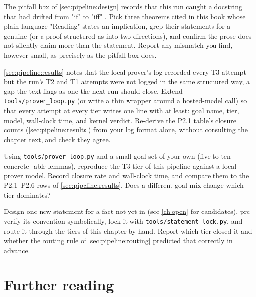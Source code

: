 \begin{exercise}[$\star\star$]\label{ex:pipeline:iff}
The pitfall box of \cref{sec:pipeline:design} records that this run caught a docstring
that had drifted from "if" to "iff" . Pick three
theorems cited in this book whose plain-language "Reading" states an implication, grep
their statements for a genuine  (or a proof structured as 
into two directions), and confirm the prose does not silently claim more than the
statement. Report any mismatch you find, however small, as precisely as the pitfall box
does.
\end{exercise}

\begin{exercise}[$\star\star$]\label{ex:pipeline:logging}
\cref{sec:pipeline:results} notes that the local prover's log recorded every T3 attempt
but the run's T2 and T1 attempts were not logged in the same structured way, a gap the
text flags as one the next run should close. Extend \texttt{tools/prover\_loop.py} (or
write a thin wrapper around a hosted-model call) so that every attempt at every tier
writes one line with at least: goal name, tier, model, wall-clock time, and kernel
verdict. Re-derive the P2.1 table's closure counts (\cref{sec:pipeline:results}) from your
log format alone, without consulting the chapter text, and check they agree.
\end{exercise}

\begin{exercise}[$\star\star\star$]
Using \texttt{tools/prover\_loop.py} and a small goal set of your own (five to ten
concrete -able lemmas), reproduce the T3 tier of this pipeline against a
local prover model. Record closure rate and wall-clock time, and compare them to the
P2.1--P2.6 rows of \cref{sec:pipeline:results}. Does a different goal mix change which
tier dominates?
\end{exercise}

\begin{exercise}[$\star\star\star$]
Design one new statement for a fact not yet in  (see
\cref{ch:open} for candidates), pre-verify its convention symbolically, lock it with
\texttt{tools/statement\_\allowbreak lock.py}, and route it through the tiers of this
chapter by hand. Report which tier closed it and whether the routing rule of
\cref{sec:pipeline:routing} predicted that correctly in advance.
\end{exercise}

\section*{Further reading}

